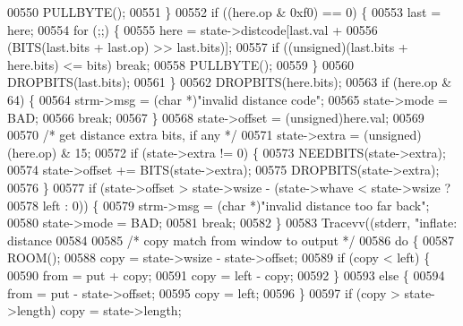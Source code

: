 \begin{DoxyCode}
{{{{{{{00550                 PULLBYTE();
00551             \}
00552             \textcolor{keywordflow}{if} ((here.op & 0xf0) == 0) \{
00553                 last = here;
00554                 \textcolor{keywordflow}{for} (;;) \{
00555                     here = state->distcode[last.val +
00556                             (BITS(last.bits + last.op) >> last.bits)];
00557                     \textcolor{keywordflow}{if} ((\textcolor{keywordtype}{unsigned})(last.bits + here.bits) <= bits) \textcolor{keywordflow}{break};
00558                     PULLBYTE();
00559                 \}
00560                 DROPBITS(last.bits);
00561             \}
00562             DROPBITS(here.bits);
00563             \textcolor{keywordflow}{if} (here.op & 64) \{
00564                 strm->msg = (\textcolor{keywordtype}{char} *)\textcolor{stringliteral}{"invalid distance code"};
00565                 state->mode = BAD;
00566                 \textcolor{keywordflow}{break};
00567             \}
00568             state->offset = (unsigned)here.val;
00569 
00570             \textcolor{comment}{/* get distance extra bits, if any */}
00571             state->extra = (\textcolor{keywordtype}{unsigned})(here.op) & 15;
00572             \textcolor{keywordflow}{if} (state->extra != 0) \{
00573                 NEEDBITS(state->extra);
00574                 state->offset += BITS(state->extra);
00575                 DROPBITS(state->extra);
00576             \}
00577             \textcolor{keywordflow}{if} (state->offset > state->wsize - (state->whave < state->wsize ?
00578                                                 left : 0)) \{
00579                 strm->msg = (\textcolor{keywordtype}{char} *)\textcolor{stringliteral}{"invalid distance too far back"};
00580                 state->mode = BAD;
00581                 \textcolor{keywordflow}{break};
00582             \}
00583             Tracevv((stderr, \textcolor{stringliteral}{"inflate:         distance %
00584 
00585             \textcolor{comment}{/* copy match from window to output */}
00586             \textcolor{keywordflow}{do} \{
00587                 ROOM();
00588                 copy = state->wsize - state->offset;
00589                 \textcolor{keywordflow}{if} (copy < left) \{
00590                     from = put + copy;
00591                     copy = left - copy;
00592                 \}
00593                 \textcolor{keywordflow}{else} \{
00594                     from = put - state->offset;
00595                     copy = left;
00596                 \}
00597                 \textcolor{keywordflow}{if} (copy > state->length) copy = state->length;
}}}}}}}}
\end{DoxyCode}
